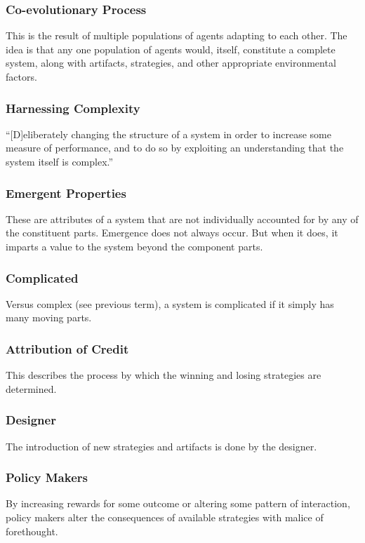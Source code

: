 \documentclass[jou,apacite]{apa6}
\begin{document}
\subsubsection{Co-evolutionary Process}
This is the result of multiple populations of agents adapting to each other.  The idea is that any one population of agents would, itself, constitute a complete system, along with artifacts, strategies, and other appropriate environmental factors.

\subsubsection{Harnessing Complexity}
``[D]eliberately changing the structure of a system in order to increase some measure of performance, and to do so by exploiting an understanding that the system itself is complex.''~\cite[page 9]{Axelrod}

\subsubsection{Emergent Properties}
These are attributes of a system that are not individually accounted for by any of the constituent parts.  Emergence does not always occur.  But when it does, it imparts a value to the system beyond the component parts.

\subsubsection{Complicated}
Versus complex (see previous term), a system is complicated if it simply has many moving parts.

\subsubsection{Attribution of Credit}
This describes the process by which the winning and losing strategies are determined.

\subsubsection{Designer}
The introduction of new strategies and artifacts is done by the designer.

\subsubsection{Policy Makers}
By increasing rewards for some outcome or altering some pattern of interaction, policy makers alter the consequences of available strategies with malice of forethought.
\end{document}
